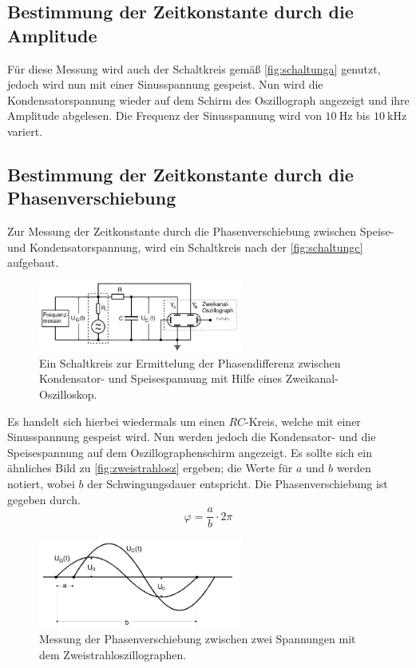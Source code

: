 \subsection{Bestimmung der Zeitkonstante durch die Amplitude}

    Für diese Messung wird auch der Schaltkreis gemäß \autoref{fig:schaltunga} genutzt, jedoch wird nun mit einer Sinusspannung gespeist. Nun wird die 
    Kondensatorspannung wieder auf dem Schirm des Oszillograph angezeigt und ihre Amplitude abgelesen. Die Frequenz der Sinusspannung wird von 
    $\SI{10}{\hertz}$ bis $\SI{10}{\kilo\hertz}$ variert. 


\subsection{Bestimmung der Zeitkonstante durch die Phasenverschiebung}

    Zur Messung der Zeitkonstante durch die Phasenverschiebung zwischen Speise- und Kondensatorspannung, wird ein Schaltkreis nach der \autoref{fig:schaltungc}
    aufgebaut. 

    \begin{figure}[H]
        \centering
        \includegraphics[width=0.6\textwidth]{bilder/aufbau_schaltungc.jpg}
        \caption{Ein Schaltkreis zur Ermittelung der Phasendifferenz zwischen Kondensator- und Speisespannung mit Hilfe eines Zweikanal-Oszilloskop. \cite{anleitung}}
        \label{fig:schaltungc}
    \end{figure}

    \noindent Es handelt sich hierbei wiedermals um einen $RC$-Kreis, welche mit einer Sinusspannung gespeist wird. Nun werden jedoch die Kondensator- und die 
    Speisespannung auf dem Oszillographenschirm angezeigt. Es sollte sich ein ähnliches Bild zu \autoref{fig:zweistrahlosz} ergeben; die Werte für $a$ und $b$
    werden notiert, wobei $b$ der Schwingungsdauer entspricht. Die Phasenverschiebung ist gegeben durch.
    \begin{equation*}
        \varphi = \frac{a}{b} \cdot 2 \pi
    \end{equation*}

    \begin{figure}
        \centerung
        \includegraphics[width=0.6\textwidth]{bilder/Zweistrahloszillograph.PNG}
        \caption{Messung der Phasenverschiebung zwischen zwei Spannungen mit dem Zweistrahloszillographen.}
        \label{fig:zweistrahlosz}
    \end{figure}